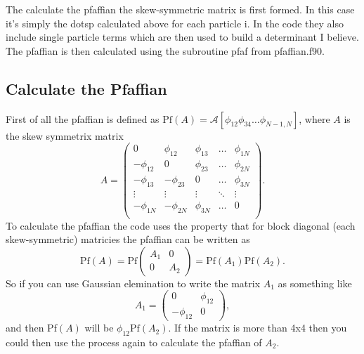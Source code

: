 The calculate the pfaffian the skew-symmetric matrix is first formed. In this case it's simply the dotsp calculated above for each particle i. In the code they also include single particle terms which are then used to build a determinant I believe. The pfaffian is then calculated using the subroutine pfaf from pfaffian.f90. 

\subsection{Calculate the Pfaffian}
First of all the pfaffian is defined as $\text{Pf}(A) = \mathcal{A}[\phi_{12}\phi_{34}\ldots\phi_{N-1,N}]$, where $A$ is the skew symmetrix matrix
\begin{equation}
   A = \begin{pmatrix} 
      0           &  \phi_{12}   &  \phi_{13}   &  \ldots   &  \phi_{1N} \\
      -\phi_{12}  &  0           &  \phi_{23}   &  \ldots   &  \phi_{2N} \\
      -\phi_{13}  &  -\phi_{23}  &  0           &  \ldots   &  \phi_{3N} \\
      \vdots      &  \vdots      &  \vdots      &  \ddots   &  \vdots    \\
      -\phi_{1N}  &  -\phi_{2N}  &  \phi_{3N}   &  \ldots   &  0         \\
\end{pmatrix}.
\end{equation}
To calculate the pfaffian the code uses the property that for block diagonal (each skew-symmetric) matricies the pfaffian can be written as
\begin{equation}
   \text{Pf}(A) = \text{Pf}\begin{pmatrix} 
      A_1   &  0 \\
      0     &  A_2
\end{pmatrix}
   = \text{Pf}(A_1)\text{Pf}(A_2).
\end{equation}
So if you can use Gaussian elemination to write the matrix $A_1$ as something like
\begin{equation}
   A_1 = \begin{pmatrix} 
      0           &  \phi_{12} \\
      -\phi_{12}  &  0
\end{pmatrix},
\end{equation}
and then Pf$(A)$ will be $\phi_{12}\text{Pf}(A_2)$. If the matrix is more than 4x4 then you could then use the process again to calculate the pfaffian of $A_2$.

